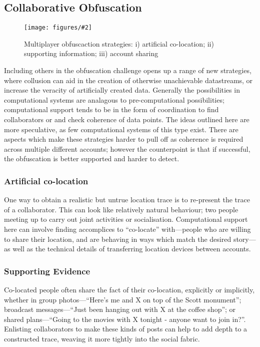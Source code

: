 \documentclass{IOS-Book-Article}     %
\newcommand{\fig}[3][0.9]{
\begin{figure}[tp]
\begin{center}
\texttt{[image: figures/\#2]}
\caption{#3}
\label{fig:#2}
\end{center}
\end{figure}
}
\newcommand{\tbox}[3][red]{{
\color{#1}\noindent{
   \fbox{\scriptsize{ {\bf #2} \textsl{#3}}}
   \vspace{2pt}
}
}}
\newcommand{\todo}[1]{\tbox{TODO:}{#1}}
\begin{document}
\subsection{Collaborative Obfuscation}
\fig{MultiPlayerObfuscation}{Multiplayer obfuscaction strategies: i) artificial
co-location; ii) supporting information; iii) account sharing}

Including others in the obfuscation challenge opens up a range of new 
strategies, where collusion can aid in the creation of otherwise unachievable
datastreams, or increase the veracity of artificially created data. Generally
the possibilities in computational systems are analagous to pre-computational
possibilities; computational support tends to be in the form of coordination to
find collaborators or and check coherence of data points. The ideas outlined
here are more speculative, as few computational systems of this type exist.
There are aspects which make these strategies harder to pull off as coherence is
required across multiple different accounts; however the counterpoint is
that if successful, the obfuscation is better supported and harder to detect.

\subsubsection{Artificial co-location}
One way to obtain a realistic but untrue location trace is to re-present the
trace of a collaborator. This can look like relatively natural
behaviour; two people meeting up to carry out joint activities or socialisation.
Computational support here can involve finding accomplices to ``co-locate''
with---people who are willing to share their location, and are behaving in ways
which match the desired story---as well as the technical details of
transferring location devices between accounts.

\subsubsection{Supporting Evidence}

Co-located people often share the fact of their co-location, explicitly or
implicitly, whether in group photos---``Here's me and X on top of the Scott
monument''; broadcast messages---``Just been hanging out with X at the coffee
shop''; or shared plans---``Going to the movies with X tonight - anyone want to
join in?''. Enlisting collaborators to make these kinds of posts can help to add depth to a
constructed trace, weaving it more tightly into the social fabric.
\end{document}
